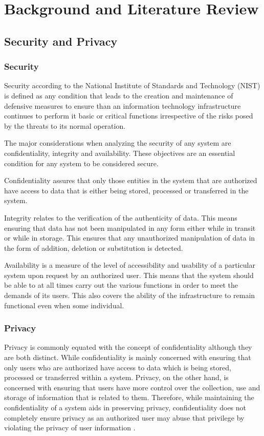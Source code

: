 \chapter{Background and Literature Review}
\label{chap:background_literature_review}

\section{Security and Privacy}

\subsection{Security}
Security according to the National Institute of Standards and Technology (NIST) \cite{Kissel2013} is defined as any condition that leads to the creation and maintenance of defensive measures to ensure than an information technology infrastructure continues to perform it basic or critical functions irrespective of the risks posed by the threats to its normal operation.

The major considerations when analyzing the security of any system are confidentiality, integrity and availability. These objectives are an essential condition for any system to be considered secure.

Confidentiality \cite{Kissel2013} assures that only those entities in the system that are authorized have access to data that is either being stored, processed or transferred in the system.

Integrity \cite{Kissel2013} relates to the verification of the authenticity of data. This means ensuring that data has not been manipulated in any form either while in transit or while in storage. This ensures that any unauthorized manipulation of data in the form of addition, deletion or substitution is detected.

Availability \cite{Kissel2013} is a measure of the level of accessibility and usability of a particular system upon request by an authorized user. This means that the system should be able to at all times carry out the various functions in order to meet the demands of its users. This also covers the ability of the infrastructure to remain functional even when some individual.

\subsection{Privacy}

Privacy is commonly equated with the concept of confidentiality although they are both distinct. While confidentiality is mainly concerned with ensuring that only users who are authorized have access to data which is being stored, processed or transferred within a system. Privacy, on the other hand, is concerned with ensuring that users have more control over the collection, use and storage of information that is related to them. Therefore, while maintaining the confidentiality of a system aids in preserving privacy, confidentiality does not completely ensure privacy as an authorized user may abuse that privilege by violating the privacy of user information \cite{pearsonprivacy}.

